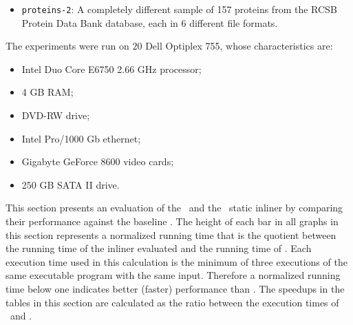 {\begin{itemize}

\item {\tt proteins-2}: A completely different sample of 157 proteins from the RCSB Protein Data Bank database, each in 6 different file formats.


\end{itemize}



The experiments were run on $20$ Dell Optiplex 755, whose characteristics are:
\begin{itemize}

\item Intel Duo Core E6750 2.66 GHz processor;

\item 4 GB RAM;

\item DVD-RW drive;

\item Intel Pro/1000 Gb ethernet;

\item Gigabyte GeForce 8600 video cards;

\item 250 GB SATA II drive. 

\end{itemize}
}


This section presents an evaluation of the \FDI\  and the \llvm\ static inliner by comparing their performance against the baseline \Never.
The height of each bar in all graphs in this section represents a normalized running time that is the quotient between the running time of the inliner evaluated and the running time of \Never. Each execution time used in this calculation is the minimum of three executions of the same executable program with the same input. Therefore a normalized running time below one indicates better (faster) performance than \Never. The speedups in the tables in this section are calculated as the ratio between the execution times of \FDI\ and \llvm.%

